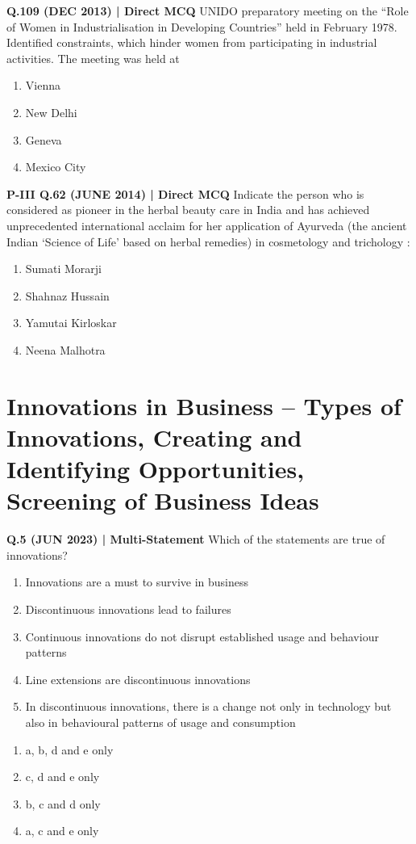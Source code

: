 \documentclass{article}
\begin{document}
\textbf{Q.109 (DEC 2013) | Direct MCQ}
UNIDO preparatory meeting on the “Role of Women in Industrialisation in Developing Countries” held in February 1978. Identified constraints, which hinder women from participating in industrial activities. The meeting was held at
\begin{enumerate}[label=(\arabic*)]
    \item Vienna
    \item New Delhi
    \item Geneva
    \item Mexico City
\end{enumerate}

\textbf{P-III Q.62 (JUNE 2014) | Direct MCQ}
Indicate the person who is considered as pioneer in the herbal beauty care in India and has achieved unprecedented international acclaim for her application of Ayurveda (the ancient Indian ‘Science of Life’ based on herbal remedies) in cosmetology and trichology :
\begin{enumerate}[label=(\arabic*)]
    \item Sumati Morarji
    \item Shahnaz Hussain
    \item Yamutai Kirloskar
    \item Neena Malhotra
\end{enumerate}

\section{Innovations in Business – Types of Innovations, Creating and Identifying Opportunities, Screening of Business Ideas}

\textbf{Q.5 (JUN 2023) | Multi-Statement}
Which of the statements are true of innovations?
\begin{enumerate}[label=\alph*.]
    \item Innovations are a must to survive in business
    \item Discontinuous innovations lead to failures
    \item Continuous innovations do not disrupt established usage and behaviour patterns
    \item Line extensions are discontinuous innovations
    \item In discontinuous innovations, there is a change not only in technology but also in behavioural patterns of usage and consumption
\end{enumerate}
\begin{enumerate}[label=(\arabic*)]
    \item a, b, d and e only
    \item c, d and e only
    \item b, c and d only
    \item a, c and e only
\end{enumerate}
\end{document}
